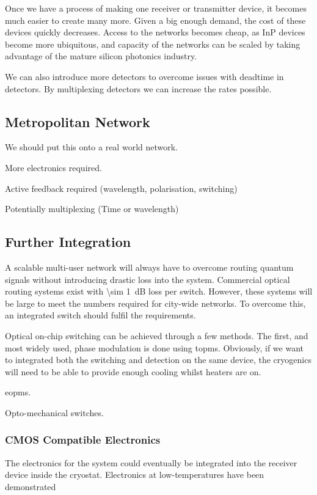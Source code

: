 Once we have a process of making one receiver or transmitter device, it becomes much easier to create many more. Given a big enough demand, the cost of these devices quickly decreases. Access to the networks becomes cheap, as \ac{InP} devices become more ubiquitous, and capacity of the networks can be scaled by taking advantage of the mature silicon photonics industry.

We can also introduce more detectors to overcome issues with deadtime in detectors. By multiplexing detectors we can increase the rates possible.

\subsection{Metropolitan Network}

We should put this onto a real world network.

More electronics required.

Active feedback required (wavelength, polarisation, switching)

Potentially multiplexing (Time or wavelength)

\subsection{Further Integration}

A scalable multi-user network will always have to overcome routing quantum signals without introducing drastic loss into the system. Commercial optical routing systems exist with \SI{\sim 1}{dB} loss per switch. However, these systems will be large to meet the numbers required for city-wide networks. To overcome this, an integrated switch should fulfil the requirements. 

Optical on-chip switching can be achieved through a few methods. The first, and most widely used, phase modulation is done using \acp{topm}. Obviously, if we want to integrated both the switching and detection on the same device, the cryogenics will need to be able to provide enough cooling whilst heaters are on.

\acp{eopm}.

Opto-mechanical switches.

\subsubsection*{CMOS Compatible Electronics}

The electronics for the system could eventually be integrated into the receiver device inside the cryostat. Electronics at low-temperatures have been demonstrated \cite{bardin2019}


